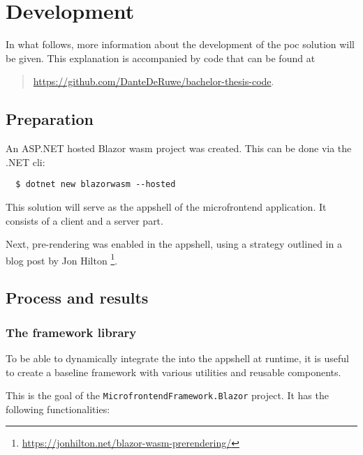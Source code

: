 \section{Development}
\label{sec:poc-development}

In what follows, more information about the development of the \gls{poc}
solution will be given. This explanation is accompanied by code that can be
found at
\begin{quote}
   \url{https://github.com/DanteDeRuwe/bachelor-thesis-code}.
\end{quote}

\subsection{Preparation}

An ASP.NET hosted Blazor \gls{wasm} project was created. This can be done via
the .NET \gls{cli}:

\begin{verbatim}
  $ dotnet new blazorwasm --hosted
\end{verbatim}

This solution will serve as the \gls{appshell} of the \gls{microfrontend}
application. It consists of a client and a server part.

Next, pre-rendering was enabled in the \gls{appshell}, using a strategy outlined
in a blog post by Jon Hilton
\footnote{\url{https://jonhilton.net/blazor-wasm-prerendering/}}.

\subsection{Process and results}

\subsubsection{The framework library}

To be able to dynamically integrate the  into the
\gls{appshell} at runtime, it is useful to create a baseline framework with
various utilities and reusable components.

This is the goal of the
\texttt{MicrofrontendFramework.Blazor}
project. It has the following functionalities:

